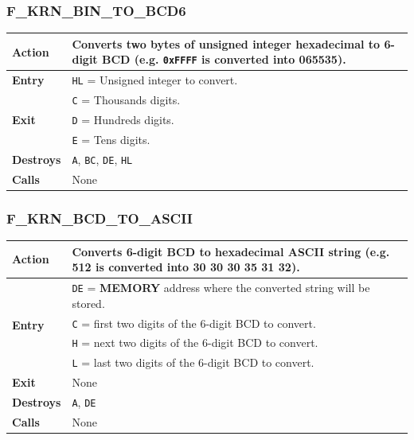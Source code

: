\documentclass[a4paper,11pt]{article}
\begin{document}
        \subsubsection{F\_KRN\_BIN\_TO\_BCD6}
        \label{func:fkrnbintobcd6}
        \begin{tabular}{l p{9cm}}
            \hline\textbf{Action}
            & Converts two bytes of unsigned integer hexadecimal to 6-digit BCD
            (e.g. \texttt{0xFFFF} is converted into 065535).\\
            \hline\textbf{Entry} & \texttt{HL} = Unsigned integer to convert.\\
            \hline\multirow[t]{3}{4em}{\textbf{Exit}}
            & \texttt{C} = Thousands digits.\\
            & \texttt{D} = Hundreds digits.\\
            & \texttt{E} = Tens digits.\\
            \hline\textbf{Destroys} & \texttt{A}, \texttt{BC}, \texttt{DE}, \texttt{HL}\\
            \hline\textbf{Calls} & None\\
            \hline
        \end{tabular}

        \subsubsection{F\_KRN\_BCD\_TO\_ASCII}
        \label{func:fkrnbcdtoascii}
        \begin{tabular}{l p{9cm}}
            \hline\textbf{Action}
            & Converts 6-digit BCD to hexadecimal ASCII string
            (e.g. 512 is converted into 30 30 30 35 31 32).\\
            \hline\multirow[t]{4}{4em}{\textbf{Entry}}
            & \texttt{DE} = \textbf{MEMORY} address where the converted string
            will be stored.\\
            & \texttt{C} = first two digits of the 6-digit BCD to convert.\\
            & \texttt{H} = next two digits of the 6-digit BCD to convert.\\
            & \texttt{L} = last two digits of the 6-digit BCD to convert.\\
            \hline\textbf{Exit} & None\\
            \hline\textbf{Destroys} & \texttt{A}, \texttt{DE}\\
            \hline\textbf{Calls} & None\\
            \hline
        \end{tabular}
\end{document}
